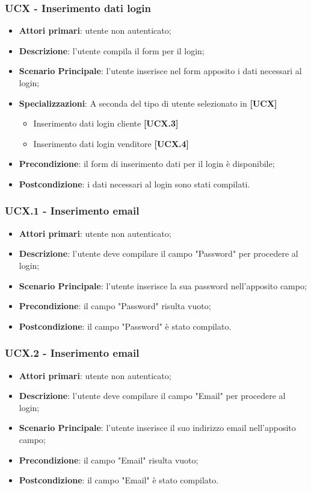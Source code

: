 \subsubsection{UCX - Inserimento dati login}
\begin{itemize}
\item \textbf{Attori primari}: utente non autenticato;
\item \textbf{Descrizione}: l'utente compila il form per il login;
\item \textbf{Scenario Principale}: l'utente inserisce nel form apposito i dati necessari al login;
\item \textbf{Specializzazioni}: A seconda del tipo di utente selezionato in \textbf{[UCX]}
\begin{itemize}
	\item Inserimento dati login cliente \textbf{[UCX.3]}
	\item Inserimento dati login venditore \textbf{[UCX.4]}
\end{itemize}
\item \textbf{Precondizione}: il form di inserimento dati per il login è disponibile;
\item \textbf{Postcondizione}: i dati necessari al login sono stati compilati.
\end{itemize}

\subsubsection{UCX.1 - Inserimento email}
\begin{itemize}
\item \textbf{Attori primari}: utente non autenticato;
\item \textbf{Descrizione}: l'utente deve compilare il campo "Password" per procedere al login;
\item \textbf{Scenario Principale}: l'utente inserisce la sua password nell'apposito campo;
\item \textbf{Precondizione}: il campo "Password" risulta vuoto;
\item \textbf{Postcondizione}: il campo "Password" è stato compilato.
\end{itemize}

\subsubsection{UCX.2 - Inserimento email}
\begin{itemize}
\item \textbf{Attori primari}: utente non autenticato;
\item \textbf{Descrizione}: l'utente deve compilare il campo "Email" per procedere al login;
\item \textbf{Scenario Principale}: l'utente inserisce il suo indirizzo email nell'apposito campo;
\item \textbf{Precondizione}: il campo "Email" risulta vuoto;
\item \textbf{Postcondizione}: il campo "Email" è stato compilato.
\end{itemize}

